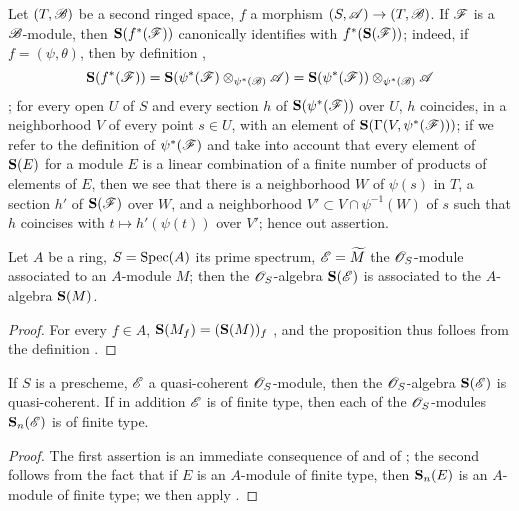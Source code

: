 \begin{env}[1.7.5]
\label{2.1.7.5}
Let $(T,\mathscr{B})$ be a second ringed space, $f$ a morphism $(S,\sh{A})\to(T,\sh{B})$.
If $\mathscr{F}$ is a $\mathscr{B}$-module, then $\mathbf{S}(f^*(\mathscr{F}))$ canonically identifies with $f^*(\mathbf{S}(\mathscr{F}))$; indeed, if $f=(\psi,\theta)$, then by definition ,
\[
  \mathbf{S}(f^*(\mathscr{F}))=\mathbf{S}(\psi^*(\mathscr{F})\otimes_{\psi^*(\mathscr{B})}\mathscr{A})=\mathbf{S}(\psi^*(\mathscr{F}))\otimes_{\psi^*(\mathscr{B})}\mathscr{A}
\]
; for every open $U$ of $S$ and every section $h$ of $\mathbf{S}(\psi^*(\mathscr{F}))$ over $U$, $h$ coincides, in a neighborhood $V$ of every point $s\in U$, with an element of $\mathbf{S}(\Gamma(V,\psi^*(\mathscr{F})))$; if we refer to the definition of $\psi^*(\mathscr{F})$  and take into account that every element of $\mathbf{S}(E)$ for a module $E$ is a linear combination of a finite number of products of elements of $E$, then we see that there is a neighborhood $W$ of $\psi(s)$ in $T$, a section $h'$ of $\mathbf{S}(\mathscr{F})$ over $W$, and a neighborhood $V'\subset V\cap\psi^{-1}(W)$ of $s$ such that $h$ coincises with $t\mapsto h'(\psi(t))$ over $V'$; hence out assertion.
\end{env}

\begin{proposition}[1.7.6]
\label{2.1.7.6}
Let $A$ be a ring, $S=\operatorname{Spec}(A)$ its prime spectrum, $\mathscr{E}=\widetilde{M}$ the $\mathscr{O}_S$-module associated to an $A$-module $M$; then the $\mathscr{O}_S$-algebra $\mathbf{S}(\mathscr{E})$ is associated to the $A$-algebra $\mathbf{S}(M)$.
\end{proposition}

\begin{proof}
\label{proof-2.1.7.6}
For every $f\in A$, $\mathbf{S}(M_f)=(\mathbf{S}(M))_f$ , and the proposition thus folloes from the definition .
\end{proof}

\begin{corollary}[1.7.7]
\label{2.1.7.7}
If $S$ is a prescheme, $\mathscr{E}$ a quasi-coherent $\mathscr{O}_S$-module, then the $\mathscr{O}_S$-algebra $\mathbf{S}(\mathscr{E})$ is quasi-coherent.
If in addition $\mathscr{E}$ is of finite type, then each of the $\mathscr{O}_S$-modules $\mathbf{S}_n(\mathscr{E})$ is of finite type.
\end{corollary}

\begin{proof}
\label{proof-2.1.7.7}
The first assertion is an immediate consequence of  and of ; the second follows from the fact that if $E$ is an $A$-module of finite type, then $\mathbf{S}_n(E)$ is an $A$-module of finite type; we then apply .
\end{proof}


